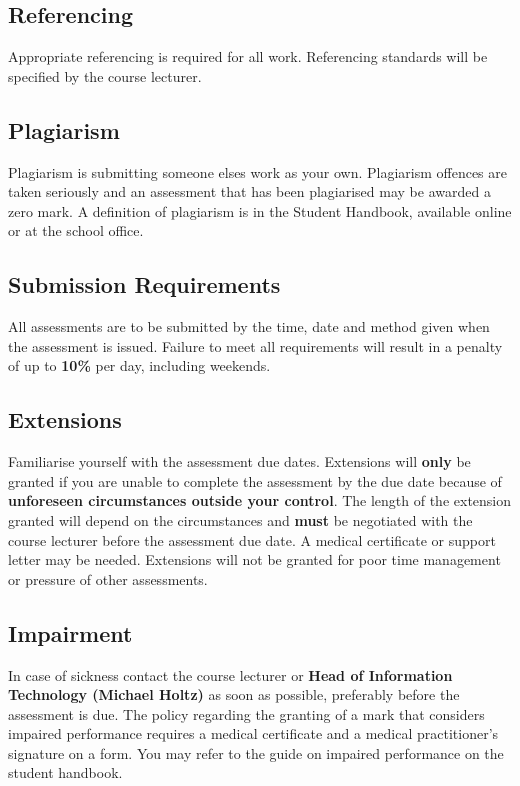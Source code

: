 \documentclass{article}
\begin{document}
\subsection*{Referencing}
Appropriate referencing is required for all work. Referencing standards will be specified by the course lecturer.

\subsection*{Plagiarism}
Plagiarism is submitting someone elses work as your own. Plagiarism offences are taken seriously and an assessment that has been plagiarised may be awarded a zero mark. A definition of plagiarism is in the Student Handbook, available online or at the school office.

\subsection*{Submission Requirements}
All assessments are to be submitted by the time, date and method given when the assessment is issued. Failure to meet all requirements will result in a penalty of up to \textbf{10\%} per day, including weekends.

\subsection*{Extensions}
Familiarise yourself with the assessment due dates. Extensions will \textbf{only} be granted if you are unable to complete the assessment by the due date because of \textbf{unforeseen circumstances outside your control}. The length of the extension granted will depend on the circumstances and \textbf{must} be negotiated with the course lecturer before the assessment due date. A medical certificate or support letter may be needed. Extensions will not be granted for poor time management or pressure of other assessments.

\subsection*{Impairment}
In case of sickness contact the course lecturer or \textbf{Head of Information Technology (Michael Holtz)} as soon as possible, preferably before the assessment is due. The policy regarding the granting of a mark that considers impaired performance requires a medical certificate and a medical practitioner’s signature on a form. You may refer to the guide on impaired performance on the student handbook.
\end{document}
